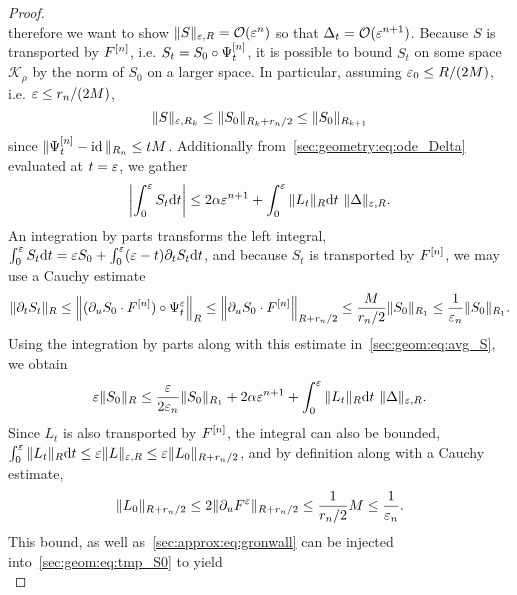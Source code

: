 \begin{proof}
\begin{equation}
\end{equation}
therefore we want to show $\| S \|_{\varepsilon, R} = \mathcal{O}( \varepsilon^{n} )$ so
that $\Delta_t = \mathcal{O}(\varepsilon^{n+1})$. Because $S$ is transported by $F^{[n]}$, i.e. $S_t = S_0 \circ \Psi^{[n]} _t$, it is possible to bound $S_t$
on some space $\mathcal{K}_\rho$ by the norm of $S_0$ on a larger space.
In particular, assuming $\varepsilon_0 \leq R/(2M)$, i.e. $\varepsilon \leq r_n/(2M)$,
\begin{equation} \label{sec:geom:eq:transported_bound}
  \| S \|_{\varepsilon, R_k} 
  \leq \| S_0 \| _{R_k + r_n/2} 
  \leq \| S_0 \| _{R_{k+1}}
\end{equation}
since $\| \Psi^{[n]} _t - \operatorname{id} \|_{R_n} \leq t M $. Additionally
from~\eqref{sec:geometry:eq:ode_Delta} evaluated at $t = \varepsilon$, we
gather 
\begin{equation} \label{sec:geom:eq:avg_S}
  \left| \int_0^\varepsilon S_t \mathrm{d} t \right|
  \leq 2\alpha \varepsilon^{n+1} 
    + \int_0^\varepsilon \|L_t\|_{R} \mathrm{d} t \ \| \Delta \|_{\varepsilon, R} .
\end{equation}
An integration by parts transforms the left integral, $\int_0^\varepsilon S_t
\mathrm{d} t = \varepsilon S_0 + \int_0^\varepsilon (\varepsilon - t) \partial_t S_t \mathrm{d} t$, and because
$S_t$ is transported by $F^{[n]}$, we may use a Cauchy estimate 
\begin{equation*}
  \| \partial_t S_t \|_R 
  \leq \left\| (\partial_u S_0 \cdot F^{[n]}) \circ \Psi^\varepsilon _t \right\|_R
  \leq \left\| \partial_u S_0 \cdot F^{[n]} \right\|_{R+r_n/2}
  \leq \frac{M}{r_n/2} \| S_0 \|_{R_1} 
  \leq \frac{1}{\varepsilon_n} \| S_0 \|_{R_1} .
\end{equation*}
Using the integration by parts along with this estimate
in~\eqref{sec:geom:eq:avg_S}, we obtain
\begin{equation*} \label{sec:geom:eq:tmp_S0}
  \varepsilon \| S_0 \|_R
  \leq \frac{\varepsilon}{2\varepsilon_n}\| S_0 \|_{R_1}
    + 2\alpha \varepsilon^{n+1} 
    + \int_0^\varepsilon \|L_t\|_{R} \mathrm{d} t \ \| \Delta \|_{\varepsilon, R} .
\end{equation*}
Since $L_t$ is also transported by $F^{[n]}$, the integral can also be
bounded, $\int_0^\varepsilon \| L_t \|_R \mathrm{d} t \leq \varepsilon \| L \|_{\varepsilon, R} \leq
\varepsilon \| L_0 \|_{R + r_n/2}$, and by definition along with a Cauchy
estimate, 
\begin{equation*}
  \| L_0 \| _{R + r_n/2} 
  \leq 2 \| \partial_u F^\varepsilon \|_{R + r_n/2}
  \leq \frac{1}{r_n/2} M \leq \frac{1}{\varepsilon_n} .
\end{equation*}
This bound, as well as~\eqref{sec:approx:eq:gronwall} can be injected
into~\eqref{sec:geom:eq:tmp_S0} to yield 
\begin{equation*}

\end{equation*}
\end{proof}
